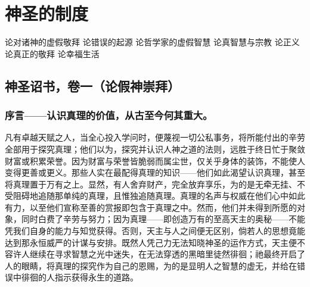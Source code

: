 
\chapter{神圣的制度}


 论对诸神的虚假敬拜\newline{} 论错误的起源\newline{} 论哲学家的虚假智慧\newline{} 论真智慧与宗教\newline{} 论正义\newline{} 论真正的敬拜\newline{} 论幸福生活\par



\section{神圣诏书，卷一（论假神崇拜）}


\subsection{序言——认识真理的价值，从古至今何其重大。}

凡有卓越天赋之人，当全心投入学问时，便蔑视一切公私事务，将所能付出的辛劳全部用于探究真理；他们以为，探究并认识人神之道的法则，远胜于终日忙于聚敛财富或积累荣誉。因为财富与荣誉皆脆弱而属尘世，仅关乎身体的装饰，不能使人变得更善或更义。那些人实在最配得真理的知识——他们如此渴望认识真理，甚至将真理置于万有之上。显然，有人舍弃财产，完全放弃享乐，为的是无牵无挂、不受阻碍地追随那单纯的真理，且惟独追随真理。真理的名声与权威在他们心中如此有力，以至他们宣称至善的赏报即包含于真理之中。然而，他们并未得到所愿的对象，同时白费了辛劳与努力；因为真理——即创造万有的至高天主的奥秘——不能凭我们自身的能力与知觉获得。否则，天主与人之间便无区别，倘若人的思想竟能达到那永恒威严的计谋与安排。既然人凭己力无法知晓神圣的运作方式，天主便不容许人继续在寻求智慧之光中迷失，在无法穿透的黑暗里徒然徘徊；祂最终开启了人的眼睛，将真理的探究作为自己的恩赐，为的是显明人之智慧的虚无，并给在错误中徘徊的人指示获得永生的道路。\par

